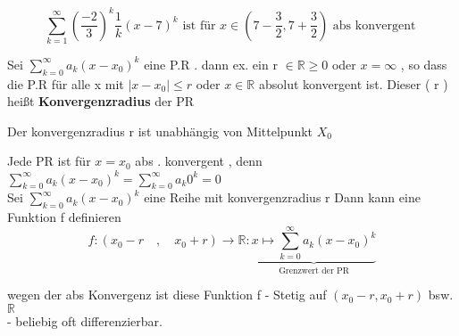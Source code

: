 \begin{example}
\[ \sum_{k=1}^{\infty}{(\frac{-2}{3})^k} \frac{1}{k} (x-7)^k  \text{ ist für } x \in (7- \frac{3}{2}, 7 + \frac{3}{2}) \text{ abs konvergent }\]
\end{example}

\begin{definition}
Sei $\sum_{k=0}^{\infty}{a_k(x-x_0)^k}$ eine P.R . dann ex. ein r $\in \mathbb{R} \geq 0 $ oder $ x = \infty $ , so dass die P.R für alle x mit $ |x-x_0| \leq r $ oder $x \in \mathbb{R} $ absolut konvergent ist. Dieser ( r )  heißt \textbf{Konvergenzradius} der PR
\end{definition}

\begin{remark}
Der konvergenzradius r ist unabhängig von Mittelpunkt $X_0$  
\end{remark}

\begin{remark}
Jede PR ist für $x = x_0$ abs . konvergent , denn $\sum_{k=0}^{\infty}{a_k(x-x_0)^k} = \sum_{k=0}^{\infty}{a_k 0^k} = 0$\\
Sei $\sum_{k=0}^{\infty}{a_k(x-x_0)^k}$ eine Reihe mit konvergenzradius r Dann kann eine Funktion f definieren \\
 \[f : ( x_0 - r \quad ,\quad x_0 +r ) \rightarrow \mathbb{R} : \underbrace{x \longmapsto \sum_{k=0}^{\infty}{a_k(x-x_0)^k}}_{\text{Grenzwert der PR}}  \]
\end{remark} 

\begin{remark}
wegen der abs Konvergenz ist diese Funktion f 
- Stetig auf $( x_0 - r , x_0 + r)$ bsw. $\mathbb{R}$\\
- beliebig oft differenzierbar. 
\end{remark}

